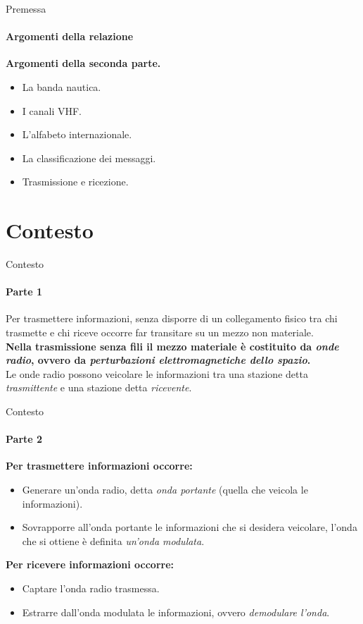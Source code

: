 \documentclass[aspectratio=169]{beamer}
\begin{document}
	\begin{frame}{Premessa}
		\framesubtitle{Argomenti della relazione}
		\textbf{Argomenti della seconda parte.}
		\begin{itemize}
			\item La banda nautica.
			\item I canali VHF.
			\item L'alfabeto internazionale. 
			\item La classificazione dei messaggi. 
			\item Trasmissione e ricezione.
		\end{itemize}
	\end{frame}

	\section{Contesto}
	\begin{frame}{Contesto}
		\framesubtitle{Parte 1}
		Per trasmettere informazioni, senza disporre di un collegamento fisico tra chi trasmette e chi riceve occorre far transitare su un mezzo non materiale.\\
		\bigskip
		\textbf{Nella trasmissione senza fili il mezzo materiale è costituito da \emph{onde radio}, ovvero da \emph{perturbazioni elettromagnetiche dello spazio}.}\\
		\bigskip
		Le onde radio possono veicolare le informazioni tra una stazione detta \emph{trasmittente} e una stazione detta \emph{ricevente}.\\
	\end{frame}

	\begin{frame}{Contesto}
		\framesubtitle{Parte 2}
			\textbf{Per trasmettere informazioni occorre:}\\
		\begin{itemize}
			\item Generare un'onda radio, detta \emph{onda portante} (quella che veicola le informazioni).
			\item Sovrapporre all'onda portante le informazioni che si desidera veicolare, l'onda che si ottiene è definita \emph{un'onda modulata}.
		\end{itemize} 
		\bigskip
		\textbf{Per ricevere informazioni occorre:}
		\begin{itemize}
			\item Captare l'onda radio trasmessa.
			\item Estrarre dall'onda modulata le informazioni, ovvero \emph{demodulare l'onda}.
		\end{itemize}
	\end{frame}
\end{document}
